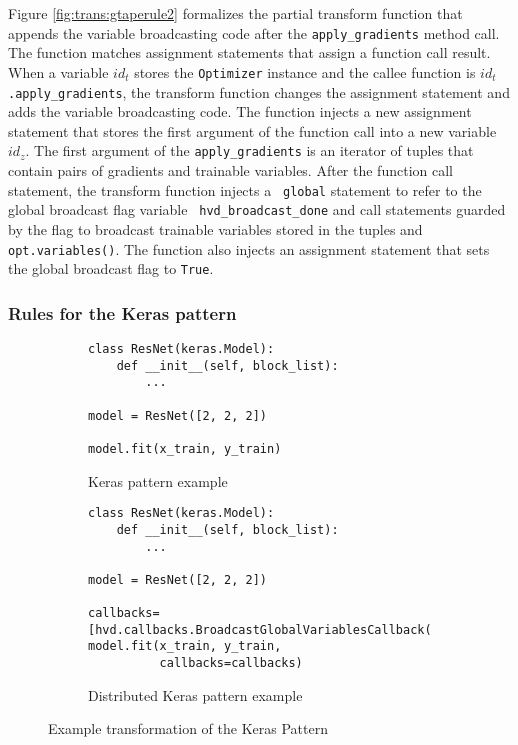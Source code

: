 Figure \ref{fig:trans:gtaperule2} formalizes the partial transform function
that appends the variable broadcasting code after the 
{\tt apply\_gradients} method call.
The function matches assignment statements that assign a function call result. 
When a variable $id_t$ stores the {\tt Optimizer} instance and the callee
function is {\tt $id_t$.apply\_gradients}, the transform function changes the
assignment statement and adds the variable broadcasting code.
The function injects a new assignment statement that stores the first argument
of the function call into a new variable $id_z$.
The first argument of the {\tt apply\_gradients} is an iterator of tuples that
contain pairs of gradients and trainable variables.
After the function call statement, the transform function injects a {\tt
global} statement to refer to the global broadcast flag variable {\tt
hvd\_broadcast\_done} and call statements guarded by the flag to broadcast
trainable variables stored in the tuples and {\tt opt.variables()}. 
The function also injects an assignment statement that sets the
global broadcast flag to {\tt True}.


   


\subsubsection{Rules for the Keras pattern}

\begin{figure}[ht!]
  \begin{subfigure}[t]{0.45\textwidth}
  \begin{lstlisting}[style=mpython]
class ResNet(keras.Model):
    def __init__(self, block_list):
        ...

model = ResNet([2, 2, 2])

model.fit(x_train, y_train)\end{lstlisting}
  \caption{Keras pattern example}
  \end{subfigure}
  \hspace{3mm}
  \begin{subfigure}[t]{0.45\textwidth}
  \begin{lstlisting}[style=mpython]
class ResNet(keras.Model):
    def __init__(self, block_list):
        ...

model = ResNet([2, 2, 2])

callbacks=[hvd.callbacks.BroadcastGlobalVariablesCallback(0)]
model.fit(x_train, y_train,
          callbacks=callbacks)\end{lstlisting}
    \caption{Distributed Keras pattern example}
  \end{subfigure}
  \caption{Example transformation of the Keras Pattern}
  \label{fig:trans:keras}
\end{figure}



